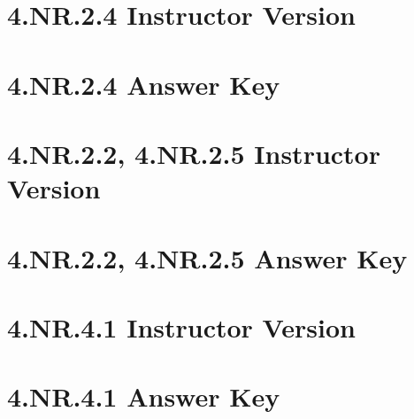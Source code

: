 \documentclass[a4paper,12pt]{article}
\begin{document}
\newpage
\section{4.NR.2.4 Instructor Version}


\newpage
\section{4.NR.2.4 Answer Key}


\newpage
\section{4.NR.2.2, 4.NR.2.5 Instructor Version}


\newpage
\section{4.NR.2.2, 4.NR.2.5 Answer Key}


\newpage
\section{4.NR.4.1 Instructor Version}


\newpage
\section{4.NR.4.1 Answer Key}

\end{document}
